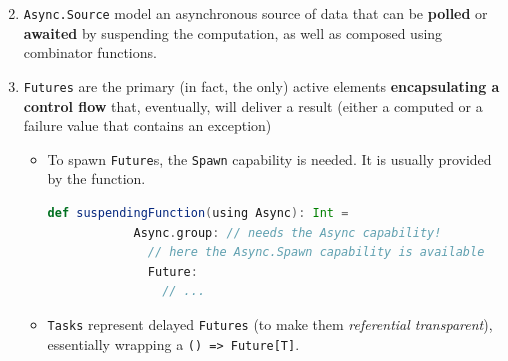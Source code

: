 \documentclass[aspectratio=1610,xcolor=dvipsnames]{beamer}
\begin{document}
%
\begin{frame}[fragile]
  \begin{block}{}
    \begin{enumerate}
      \setcounter{enumi}{1}
      \item \texttt{Async.Source} model an asynchronous source of data that can be \textbf{polled} or \textbf{awaited} by suspending the computation, as well as composed using combinator functions.
      \item \texttt{Futures} are the primary (in fact, the only) active elements \textbf{encapsulating a control flow} that, eventually, will deliver a result (either a computed or a failure value that contains an exception)
      \begin{itemize}
        \item To spawn \texttt{Future}s, the \texttt{Spawn} capability is needed. It is usually provided by the  function.
        \begin{lstlisting}[language=scala,gobble=10]
          def suspendingFunction(using Async): Int =
            Async.group: // needs the Async capability!
              // here the Async.Spawn capability is available
              Future:
                // ...
        \end{lstlisting}
        \item \texttt{Tasks} represent delayed \texttt{Futures} (to make them \textit{referential transparent}), essentially wrapping a \texttt{() => Future[T]}.
      \end{itemize}
    \end{enumerate}
  \end{block}
\end{frame}
%
\end{document}
